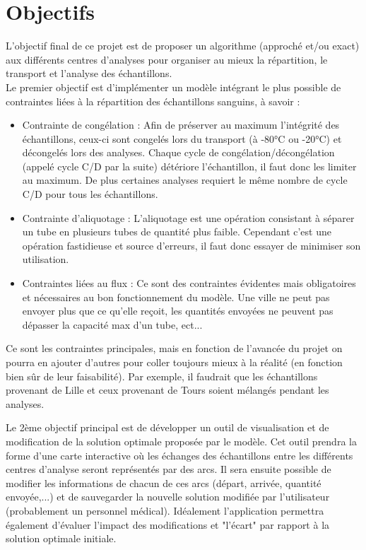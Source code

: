 \documentclass{polytech/polytech}
\numberwithin{figure}{chapter}
\begin{document}
\section{Objectifs}
L'objectif final de ce projet est de proposer un algorithme (approché et/ou exact) aux différents centres d'analyses pour organiser au mieux la répartition, le transport et l'analyse des échantillons.\\

Le premier objectif est d'implémenter un modèle intégrant le plus possible de contraintes liées à la répartition des échantillons sanguins, à savoir : 
\begin{itemize}
    \item Contrainte de congélation : Afin de préserver au maximum l'intégrité des échantillons, ceux-ci sont congelés lors du transport (à -80°C ou -20°C) et décongelés lors des analyses. Chaque cycle de congélation/décongélation (appelé cycle C/D par la suite) détériore l'échantillon, il faut donc les limiter au maximum. De plus certaines analyses requiert le même nombre de cycle C/D pour tous les échantillons.
    \item Contrainte d'aliquotage : L'\gls{aliquotage} est une opération consistant à séparer un tube en plusieurs tubes de quantité plus faible. Cependant c'est une opération fastidieuse et source d'erreurs, il faut donc essayer de minimiser son utilisation.
    \item Contraintes liées au flux : Ce sont des contraintes évidentes mais obligatoires et nécessaires au bon fonctionnement du modèle. Une ville ne peut pas envoyer plus que ce qu'elle reçoit, les quantités envoyées ne peuvent pas dépasser la capacité max d'un tube, ect...\\
\end{itemize}

\begin{flushleft}
Ce sont les contraintes principales, mais en fonction de l'avancée du projet on pourra en ajouter d'autres pour coller toujours mieux à la réalité (en fonction bien sûr de leur faisabilité). Par exemple, il faudrait que les échantillons provenant de Lille et ceux provenant de Tours soient mélangés pendant les analyses.
\end{flushleft}

\begin{flushleft}
Le 2ème objectif principal est de développer un outil de visualisation et de modification de la solution optimale proposée par le modèle. Cet outil prendra la forme d'une carte interactive où les échanges des échantillons entre les différents centres d'analyse seront représentés par des arcs. Il sera ensuite possible de modifier les informations de chacun de ces arcs (départ, arrivée, quantité envoyée,...) et de sauvegarder la nouvelle solution modifiée par l'utilisateur (probablement un personnel médical). Idéalement l'application permettra également d'évaluer l'impact des modifications et "l'écart" par rapport à la solution optimale initiale.
\end{flushleft}
\end{document}
